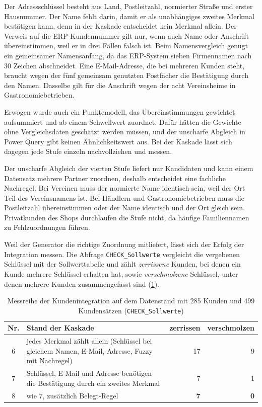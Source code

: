 \documentclass[a4paper,12pt]{article}
\newcommand{\pq}[1]{\texttt{#1}}        %
\begin{document}
Der Adressschlüssel besteht aus Land, Postleitzahl, normierter Straße und erster Hausnummer. Der Name fehlt darin, damit er als unabhängiges zweites Merkmal bestätigen kann, denn in der Kaskade entscheidet kein Merkmal allein. Der Verweis auf die ERP-Kundennummer gilt nur, wenn auch Name oder Anschrift übereinstimmen, weil er in drei Fällen falsch ist. Beim Namensvergleich genügt ein gemeinsamer Namensanfang, da das ERP-System sieben Firmennamen nach 30 Zeichen abschneidet. Eine E-Mail-Adresse, die bei mehreren Kunden steht, braucht wegen der fünf gemeinsam genutzten Postfächer die Bestätigung durch den Namen. Dasselbe gilt für die Anschrift wegen der acht Vereinsheime in Gastronomiebetrieben.

Erwogen wurde auch ein Punktemodell, das Übereinstimmungen gewichtet aufsummiert und ab einem Schwellwert zuordnet. Dafür hätten die Gewichte ohne Vergleichsdaten geschätzt werden müssen, und der unscharfe Abgleich in Power Query gibt keinen Ähnlichkeitswert aus. Bei der Kaskade lässt sich dagegen jede Stufe einzeln nachvollziehen und messen.

Der unscharfe Abgleich der vierten Stufe liefert nur Kandidaten und kann einem Datensatz mehrere Partner zuordnen, deshalb entscheidet eine fachliche Nachregel. Bei Vereinen muss der normierte Name identisch sein, weil der Ort Teil des Vereinsnamens ist. Bei Händlern und Gastronomiebetrieben muss die Postleitzahl übereinstimmen oder der Name identisch und der Ort gleich sein. Privatkunden des Shops durchlaufen die Stufe nicht, da häufige Familiennamen zu Fehlzuordnungen führen.

Weil der Generator die richtige Zuordnung mitliefert, lässt sich der Erfolg der Integration messen. Die Abfrage \pq{CHECK\_Sollwerte} vergleicht die vergebenen Schlüssel mit der Sollwerttabelle und zählt \emph{zerrissene} Kunden, bei denen ein Kunde mehrere Schlüssel erhalten hat, sowie \emph{verschmolzene} Schlüssel, unter denen mehrere Kunden zusammengefasst sind (\cref{tab:messreihe}).

\begin{table}[H]
  \centering\small
  \caption{Messreihe der Kundenintegration auf dem Datenstand mit 285 Kunden und 499 Kundensätzen (\pq{CHECK\_Sollwerte})}
  \label{tab:messreihe}
  \begin{tabular}{@{}c>{\raggedright\arraybackslash}p{9.4cm}rr@{}}
    \toprule
    Nr. & Stand der Kaskade & zerrissen & verschmolzen \\
    \midrule
    6 & jedes Merkmal zählt allein (Schlüssel bei gleichem Namen, E-Mail, Adresse, Fuzzy mit Nachregel) & 17 & 9 \\
    7 & Schlüssel, E-Mail und Adresse benötigen die Bestätigung durch ein zweites Merkmal & 7 & 1 \\
    8 & wie 7, zusätzlich Belegt-Regel & \textbf{7} & \textbf{0} \\
    \bottomrule
  \end{tabular}
\end{table}
\end{document}
